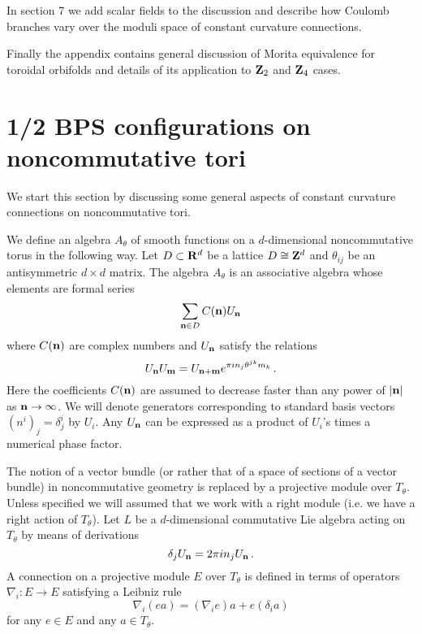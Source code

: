 \documentclass[a4paper,a4paper]{article}
\begin{document}
In section 7 we add scalar fields to the discussion and describe how Coulomb branches vary over 
the moduli space of constant curvature connections. 

Finally the appendix contains general discussion of Morita equivalence for toroidal orbifolds and 
details of its application to ${\bf Z}_{2}$ and ${\bf Z}_{4}$ cases. 

\section{ 1/2 BPS configurations on noncommutative tori}
We start this section by discussing  some general aspects 
of constant curvature connections on noncommutative tori. 

We define an algebra $A_{\theta}$ of smooth functions on a $d$-dimensional 
noncommutative torus in the following way. Let $D\subset {\bf R}^{d}$ 
be a lattice $D\cong {\bf Z}^{d}$ and $\theta_{ij}$ be an antisymmetric 
$d\times d$ matrix. The algebra $A_{\theta}$ is an associative algebra 
whose elements are formal series 
$$
\sum_{{\bf n}\in D} C({\bf n})U_{\bf n}
$$ 
where $C({\bf n})$ are complex numbers and $U_{\bf n}$ satisfy the relations 
\begin{equation} \label{nct}
U_{\bf n}U_{\bf m}=U_{\bf n + m }e^{\pi i n_{j}\theta^{jk}m_{k}} \, .
\end{equation}
Here the coefficients $ C({\bf n})$ are assumed to decrease faster than 
any power of $|{\bf n}|$ as ${\bf n}\to \infty$. We will denote 
generators corresponding to standard basis vectors 
$(n^{i})_{j}  = \delta^{i}_{j}$ by $U_{i}$. Any $U_{\bf n}$ can be 
expressed as a product of $U_{i}$'s times a numerical phase factor.   

The notion of a vector bundle (or rather that of a space of sections of 
a vector bundle) in noncommutative geometry is replaced by a projective module 
over $T_{\theta}$. Unless specified we will assumed that we work with a 
right module (i.e. we have a right action of $T_{\theta}$). 
Let $L$ be a $d$-dimensional commutative Lie algebra acting 
on $T_{\theta}$ by means of derivations
\begin{equation}
\delta_{j} U_{\bf n} = 2\pi i n_{j} U_{\bf n} \, .
\end{equation} 
A connection  on a projective module $E$ over $T_{\theta}$ 
is defined in terms of operators $\nabla_{i}: E\to E$ satisfying 
a Leibniz rule 
$$
\nabla_{i}(ea) = (\nabla_{i}e)a + e(\delta_{i}a)
$$ 
for any $e\in E$  and any $a\in T_{\theta}$. 
\end{document}
